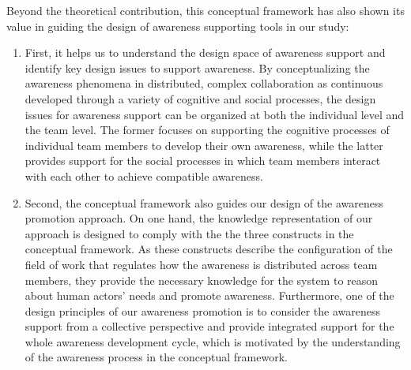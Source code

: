 Beyond the theoretical contribution, this conceptual framework has also shown its value in guiding the design of awareness supporting tools in our study:

\begin{enumerate}
	\item First, it helps us to understand the design space of awareness support and identify key design issues to support awareness. By conceptualizing the awareness phenomena in distributed, complex collaboration as continuous developed through a variety of cognitive and social processes, the design issues for awareness support can be organized at both the individual level and the team level. The former focuses on supporting the cognitive processes of individual team members to develop their own awareness, while the latter provides support for the social processes in which team members interact with each other to achieve compatible awareness.
	\item Second, the conceptual framework also guides our design of the awareness promotion approach. On one hand, the knowledge representation of our approach is designed to comply with the the three constructs in the conceptual framework. As these constructs describe the configuration of the field of work that regulates how the awareness is distributed across team members, they provide the necessary knowledge for the system to reason about human actors' needs and promote awareness. Furthermore, one of the design principles of our awareness promotion is to consider the awareness support from a collective perspective and provide integrated support for the whole awareness development cycle, which is motivated by the understanding of the awareness process in the conceptual framework.
\end{enumerate}

